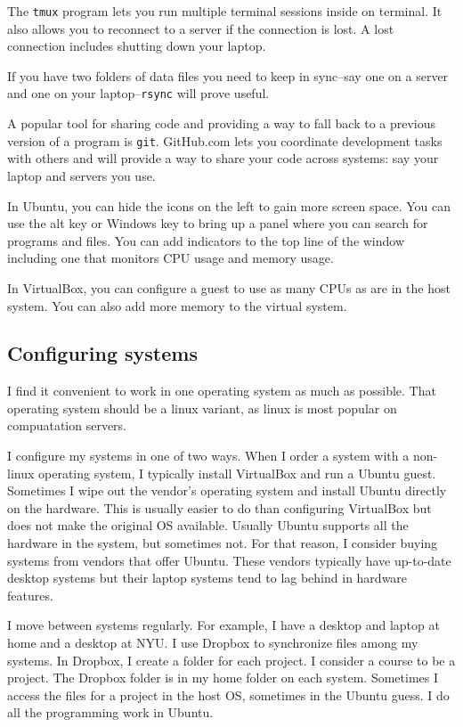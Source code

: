 \documentclass{article}
\let\code\texttt %
\begin{document}
The \code{tmux} program lets you run multiple terminal sessions inside
on terminal. It also allows you to reconnect to a server if the
connection is lost. A lost connection includes shutting down your
laptop.

If you have two folders of data files you need to keep in sync--say one
on a server and one on your laptop--\code{rsync} will prove useful.

A popular tool for sharing code and providing a way to fall back to a
previous version of a program is \code{git}. GitHub.com lets you coordinate
development tasks with others and will provide a way to share your code
across systems: say your laptop and servers you use.

In Ubuntu, you can hide the icons on the left to gain more screen space.
You can use the alt key or Windows key to bring up a panel where you can
search for programs and files. You can add indicators to the top line of
the window including one that monitors CPU usage and memory usage.

In VirtualBox, you can configure a guest to use as many CPUs as are in
the host system. You can also add more memory to the virtual system.


\subsection{Configuring systems}

I find it convenient to work in one operating system as much as
possible. That operating system should be a linux variant, as linux is
most popular on compuatation servers.

I configure my systems in one of two ways. When I order a system with a
non-linux operating system, I typically install VirtualBox and run a
Ubuntu guest. Sometimes I wipe out the vendor's operating system and
install Ubuntu directly on the hardware. This is usually easier to do
than configuring VirtualBox but does not make the original OS available.
Usually Ubuntu supports all the hardware in the system, but sometimes
not. For that reason, I consider buying systems from vendors that offer
Ubuntu. These vendors typically have up-to-date desktop systems but
their laptop systems tend to lag behind in hardware features.   

I move between systems regularly. For example, I have a desktop and
laptop at home and a desktop at NYU. I use Dropbox to synchronize files
among my systems. In Dropbox, I create a folder for each project. I
consider a course to be a project. The Dropbox folder is in my home
folder on each system. Sometimes I access the files for a project in the
host OS, sometimes in the Ubuntu guess. I do all the programming work in
Ubuntu.
\end{document}
